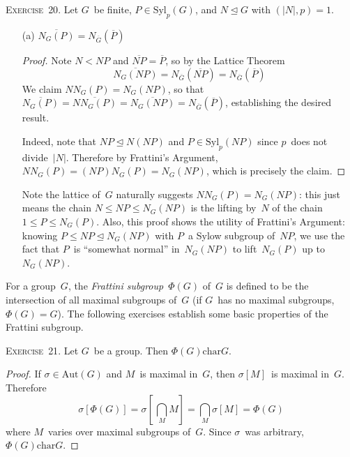 \documentclass[letterpaper]{article}
\newcommand{\exercise}[1]{\goodbreak\noindent\textsc{Exercise~{#1}.}}
\newcommand{\bigsect}{\bigcap}
\newcommand{\subgroup}{\le}
\newcommand{\normal}{\trianglelefteq}
\newcommand{\aut}{\mathrm{Aut}}
\newcommand{\chr}{\mathrel{\mathrm{char}}}
\newcommand{\syl}{\mathrm{Syl}}
\newcommand{\res}[1]{\overline{#1}}
\newcommand{\ord}[1]{|{#1}|}
\begin{document}
\exercise{20}
Let $G$~be finite, $P\in\syl_p(G)$, and $N\normal G$ with $(\ord{N},p)=1$.
\begin{enumerate}[itemsep=0pt]
\item[(a)] $\res{N_G(P)}=N_{\res{G}}(\res{P})$
\begin{proof}
Note $N<NP$ and $\res{NP}=\res{P}$, so by the Lattice Theorem
$$\res{N_G(NP)}=N_{\res{G}}(\res{NP})=N_{\res{G}}(\res{P})$$
We claim $NN_G(P)=N_G(NP)$, so that $\res{N_G(P)}=\res{NN_G(P)}=\res{N_G(NP)}=N_{\res{G}}(\res{P})$, establishing the desired result.

Indeed, note that $NP\normal N(NP)$ and $P\in\syl_p(NP)$ since $p$~does not divide~$\ord{N}$. Therefore by Frattini's Argument, $NN_G(P)=(NP)N_G(P)=N_G(NP)$, which is precisely the claim.
\end{proof}
\noindent Note the lattice of~$G$ naturally suggests $NN_G(P)=N_G(NP)$: this just means the chain $N\subgroup NP\subgroup N_G(NP)$ is the lifting by~$N$ of the chain $1\subgroup P\subgroup N_G(P)$. Also, this proof shows the utility of Frattini's Argument: knowing $P\subgroup NP\normal N_G(NP)$ with $P$~a Sylow subgroup of~$NP$, we use the fact that $P$~is ``somewhat normal'' in~$N_G(NP)$ to lift~$N_G(P)$ up to~$N_G(NP)$.
\end{enumerate}

\noindent For a group~$G$, the \emph{Frattini subgroup}~$\Phi(G)$ of~$G$ is defined to be the intersection of all maximal subgroups of~$G$ (if $G$~has no maximal subgroups, $\Phi(G)=G$). The following exercises establish some basic properties of the Frattini subgroup.

\bigskip
\exercise{21} Let $G$~be a group. Then $\Phi(G)\chr G$.
\begin{proof}
If $\sigma\in\aut(G)$ and $M$~is maximal in~$G$, then $\sigma[M]$~is maximal in~$G$. Therefore
$$\sigma[\Phi(G)]=\sigma[\,\bigsect_M M]=\bigsect_M\sigma[M]=\Phi(G)$$
where $M$~varies over maximal subgroups of~$G$. Since $\sigma$~was arbitrary, $\Phi(G)\chr G$.
\end{proof}
\end{document}
